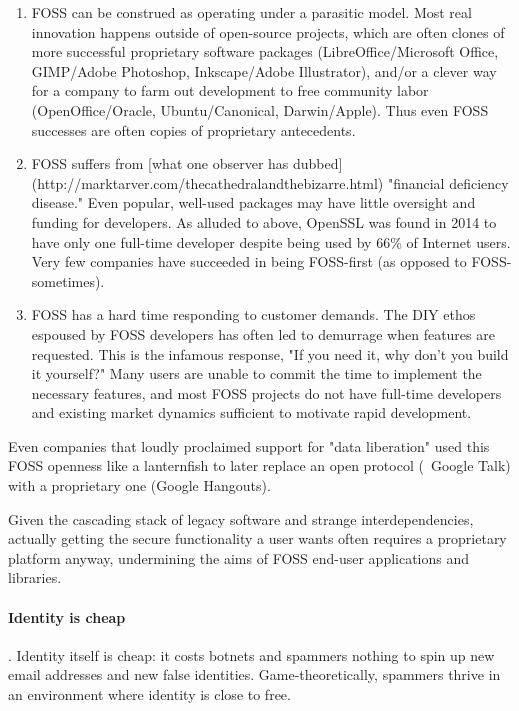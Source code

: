 \begin{enumerate}
	\item  FOSS can be construed as operating under a parasitic model.  Most real innovation happens outside of open-source projects, which are often clones of more successful proprietary software packages (LibreOffice/Microsoft Office, GIMP/Adobe Photoshop, Inkscape/Adobe Illustrator), and/or a clever way for a company to farm out development to free community labor (OpenOffice/Oracle, Ubuntu/Canonical, Darwin/Apple).  Thus even FOSS successes are often copies of proprietary antecedents.
  \item  FOSS suffers from [what one observer has dubbed](http://marktarver.com/thecathedralandthebizarre.html) "financial deficiency disease."  Even popular, well-used packages may have little oversight and funding for developers.  As alluded to above, OpenSSL was found in 2014 to have only one full-time developer despite being used by 66\% of Internet users.  Very few companies have succeeded in being FOSS-first (as opposed to FOSS-sometimes).
  \item  FOSS has a hard time responding to customer demands.  The DIY ethos espoused by FOSS developers has often led to demurrage when features are requested.  This is the infamous response, "If you need it, why don't you build it yourself?"  Many users are unable to commit the time to implement the necessary features, and most FOSS projects do not have full-time developers and existing market dynamics sufficient to motivate rapid development.
\end{enumerate}

Even companies that loudly proclaimed support for "data liberation" used this FOSS openness like a lanternfish to later replace an open protocol (\eg~Google Talk) with a proprietary one (Google Hangouts).

Given the cascading stack of legacy software and strange interdependencies, actually getting the secure functionality a user wants often requires a proprietary platform anyway, undermining the aims of FOSS end-user applications and libraries.

\paragraph{Identity is cheap}.  Identity itself is cheap:  it costs botnets and spammers nothing to spin up new email addresses and new false identities.  Game-theoretically, spammers thrive in an environment where identity is close to free.

